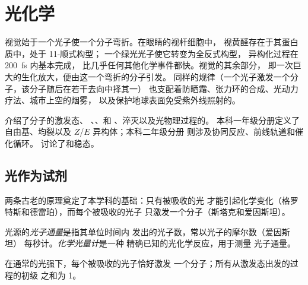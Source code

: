 \chapter{光化学}\label{ch:b3:photochemistry}

视觉始于一个光子使一个分子弯折。在眼睛的视杆细胞中，
视黄醛存在于其蛋白质中，处于 11-顺式构型；
一个绿光光子使它转变为全反式构型，
异构化过程在 \qty{200}{fs} 内基本完成，
比几乎任何其他化学事件都快。视觉的其余部分，
即一次巨大的生化放大，便由这一个弯折的分子引发。
同样的规律（一个光子激发一个分子，该分子随后在若干去向中择其一）
也支配着防晒霜、张力环的合成、光动力疗法、城市上空的烟雾，
以及保护地球表面免受紫外线照射的。

\begin{recall}
介绍了分子的激发态、
、、和
、淬灭以及光物理过程的。
本科一年级分册定义了自由基、均裂以及 $Z$/$E$ 异构体；本科二年级分册
则涉及协同反应、前线轨道和催化循环。
讨论了和稳态。
\end{recall}

\section{光作为试剂}

两条古老的原理奠定了本学科的基础：只有被吸收的光
才能引起化学变化（格罗特斯和德雷珀），而每个被吸收的光子
只激发一个分子（斯塔克和爱因斯坦）。

\begin{definition}\label{def:b3:photochemistry:photon-flux}
光源的\emph{光子通量}是指其单位时间内
发出的光子数，常以光子的摩尔数（爱因斯坦）
每秒计。\emph{化学光量计}是一种
精确已知的光化学反应，用于测量
光子通量。
\end{definition}

\begin{proposition}\label{prop:b3:photochemistry:stark-einstein}
在通常的光强下，每个被吸收的光子恰好激发
一个分子；所有从激发态出发的过程的初级
之和为 1。
\end{proposition}

